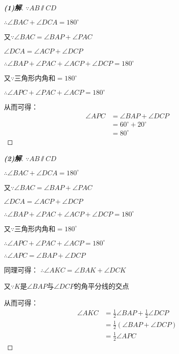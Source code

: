 \documentclass{ctexart}
\begin{document}
\begin{proof}[\textbf{(1)解}]
  $\because AB \varparallel CD$

  $\therefore \angle BAC + \angle DCA = 180^\circ$

  又$\because \angle BAC = \angle BAP + \angle PAC$
  
  $\angle DCA = \angle ACP + \angle DCP$

  $\therefore \angle BAP + \angle PAC + \angle ACP + \angle DCP = 180^\circ$

  又$\because$三角形内角和$=180^\circ$
  
  $\therefore \angle APC + \angle PAC + \angle ACP = 180^\circ$

  从而可得：
  \begin{align*}
    \angle APC & = \angle BAP + \angle DCP \\
               & = 60^\circ + 20^\circ\\
               & = 80^\circ                 
  \end{align*}  
\end{proof}

\begin{proof}[\textbf{(2)解}]
  $\because AB \varparallel CD$

  $\therefore \angle BAC + \angle DCA = 180^\circ$

  又$\because \angle BAC = \angle BAP + \angle PAC$
  
  $\angle DCA = \angle ACP + \angle DCP$

  $\therefore \angle BAP + \angle PAC + \angle ACP + \angle DCP = 180^\circ$

  又$\because$三角形内角和$=180^\circ$
  
  $\therefore \angle APC + \angle PAC + \angle ACP = 180^\circ$

  $\therefore \angle APC = \angle BAP + \angle DCP$

  同理可得：
  $\therefore \angle AKC = \angle BAK + \angle DCK$
  
  又$\because K$是$\angle BAP$与$\angle DCP$的角平分线的交点

  从而可得：
  \begin{align*}
    \angle AKC & = \frac{1}{2}\angle BAP + \frac{1}{2}\angle DCP \\
               & = \frac{1}{2}\left(\angle BAP + \angle DCP\right) \\
               & = \frac{1}{2}\angle APC                 
  \end{align*}  
\end{proof}
\end{document}
